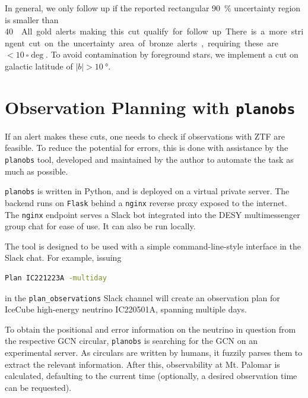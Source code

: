 \documentclass[
    a4paper, %
    fontsize=10pt, %
    twoside=true, %
    numbers=noenddot, %
    fontmethod=tex,
]{kaobook}
\begin{document}
In general, we only follow up if the reported rectangular \SI{90}{\percent} uncertainty region is smaller than \SI{40}{\square\deg}. All gold alerts making this cut qualify for follow up. There is a more stringent cut on the uncertainty area of bronze alerts, requiring these are $<\SI{10}{\square\deg}$. To avoid contamination by foreground stars, we implement a cut on galactic latitude of $|b|>\SI{10}{\degree}$.

\section{Observation Planning with \texttt{planobs}}\label{planobs}
If an alert makes these cuts, one needs to check if observations with ZTF are feasible. To reduce the potential for errors, this is done with assistance by the \texttt{planobs}  tool, developed and maintained by the author to automate the task as much as possible.

\texttt{planobs} is written in Python, and is deployed on a virtual private server. The backend runs on \texttt{Flask} behind a \texttt{nginx} reverse proxy exposed to the internet. The \texttt{nginx} endpoint serves a Slack bot integrated into the DESY multimessenger group chat for ease of use. It can also be run locally.

The tool is designed to be used with a simple command-line-style interface in the Slack chat. For example, issuing
\begin{lstlisting}[language=bash,style=kaolstplain]
Plan IC221223A -multiday
\end{lstlisting}
in the \texttt{plan\_observations} Slack channel will create an observation plan for IceCube high-energy neutrino IC220501A, spanning multiple days.

To obtain the positional and error information on the neutrino in question from the respective GCN circular, \texttt{planobs} is searching for the GCN on an experimental server. As circulars are written by humans, it fuzzily parses them to extract the relevant information. After this, observability at Mt. Palomar is calculated, defaulting to the current time (optionally, a desired observation time can be requested). 
\end{document}
